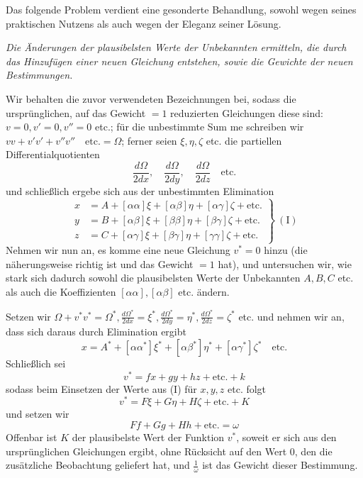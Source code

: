 Das folgende Problem verdient eine gesonderte Behandlung, sowohl wegen seines praktischen Nutzens als auch wegen der Eleganz seiner Lösung.

\textit{Die Änderungen der plausibelsten Werte der Unbekannten ermitteln, die durch das Hinzufügen einer neuen Gleichung entstehen, sowie die Gewichte der neuen Bestimmungen.}

Wir behalten die zuvor verwendeten Bezeichnungen bei, sodass die ursprünglichen, auf das Gewicht \(=1\) reduzierten Gleichungen diese sind: \(v=0,\allowbreak v'=0,\allowbreak v''=0\) etc.; für die unbestimmte Sum%
me schreiben wir \(vv+v'v'+v''v''\quad\text{etc.}=\Omega\); ferner seien \(\xi,\eta,\zeta\) etc. die partiellen Differentialquotienten
\[
\frac{d\Omega}{2dx},\quad\frac{d\Omega}{2dy},\quad\frac{d\Omega}{2dz}\quad\text{etc.}
\]
und schließlich ergebe sich aus der unbestimmten Elimination
\[
\left.\begin{aligned}
x&=A+[\alpha\alpha]\xi+[\alpha\beta]\eta+[\alpha\gamma]\zeta+\text{etc.}\\
y&=B+[\alpha\beta]\xi+[\beta\beta]\eta+[\beta\gamma]\zeta+\text{etc.}\\
z&=C+[\alpha\gamma]\xi+[\beta\gamma]\eta+[\gamma\gamma]\zeta+\text{etc.}
\end{aligned}\right\}\ (\mathrm{I})
\]
Nehmen wir nun an, es komme eine neue Gleichung \(v^*=0\) hinzu (die näherungsweise richtig ist und das Gewicht \(=1\) hat), und untersuchen wir, wie stark sich dadurch sowohl die plausibelsten Werte der Unbekannten \(A,B,C\) etc. als auch die Koeffizienten \([\alpha\alpha],[\alpha\beta]\) etc. ändern.

Setzen wir \(\Omega+v^*v^*=\Omega^*,\allowbreak\frac{d\Omega^*}{2dx}=\xi^*,\allowbreak\frac{d\Omega^*}{2dy}=\eta^*,\allowbreak\frac{d\Omega^*}{2dz}=\zeta^*\) etc. und nehmen wir an, dass sich daraus durch Elimination ergibt
\[
x=A^*+[\alpha\alpha^*]\xi^*+[\alpha\beta^*]\eta^*+[\alpha\gamma^*]\zeta^*\quad\text{etc.}
\]
Schließlich sei
\[
v^*=fx+gy+hz+\text{etc.}+k
\]
sodass beim Einsetzen der Werte aus (I) für \(x,y,z\) etc. folgt
\[
v^*=F\xi+G\eta+H\zeta+\text{etc.}+K
\]
und setzen wir
\[
Ff+Gg+Hh+\text{etc.}=\omega
\]
Offenbar ist \(K\) der plausibelste Wert der Funktion \(v^*\), soweit er sich aus den ursprünglichen Gleichungen ergibt, ohne Rücksicht auf den Wert \(0\), den die zusätzliche Beobachtung geliefert hat, und \(\frac1\omega\) ist das Gewicht dieser Bestimmung.

